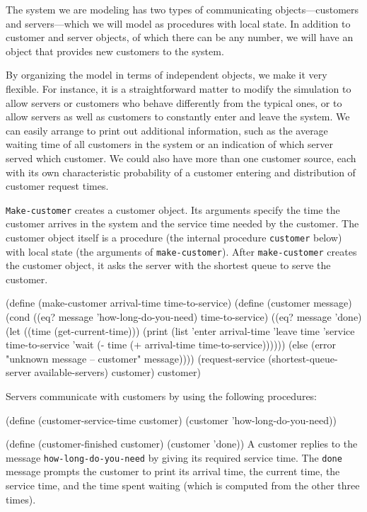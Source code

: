 
The system we are modeling has two types of communicating
objects---customers and servers---which we will model as procedures with local
state.  In addition to customer and server objects, of which there can
be any number, we will have an object that provides new customers to
the system.

By organizing the model in terms of independent objects, we make it very
flexible.  For instance, it is a straightforward matter to modify the
simulation to allow servers or customers who behave differently from
the typical ones, or to allow servers as well as customers to
constantly enter and leave the system.   We can easily
arrange to print out additional information, such as the average
waiting time of all customers in the system or an indication of which
server served which customer.  We could also have more than one
customer source, each with its own characteristic probability
of a customer entering and distribution of customer request times.


{\tt Make-customer} creates a customer object.  Its arguments specify
the time the customer arrives in the system and the service time
needed by the customer.  The customer object itself is a procedure
(the internal procedure {\tt customer} below) with local state (the arguments of
{\tt make-customer}).  After {\tt make-customer} creates the customer
object, it asks the server with the shortest queue to serve the customer.

\code
(define (make-customer arrival-time time-to-service)
  (define (customer message)
    (cond ((eq? message 'how-long-do-you-need)
           time-to-service)
          ((eq? message 'done)
           (let ((time (get-current-time)))
             (print
              (list 'enter arrival-time
                    'leave time
                    'service time-to-service 
                    'wait (- time (+ arrival-time
                                     time-to-service))))))
          (else
           (error "unknown message -- customer" message))))
  (request-service (shortest-queue-server available-servers)
                   customer)
  customer)
\uncode

Servers communicate with customers by using the following procedures:

\code
(define (customer-service-time customer)
  (customer 'how-long-do-you-need))

(define (customer-finished customer)
  (customer 'done))
\uncode\noindent
 A customer replies to the message {\tt how-long-do-you-need} by
giving its required service time.  The {\tt done} message prompts the
customer to print its arrival time, the current time, the service
time, and the time spent waiting (which is computed from the other
three times).

